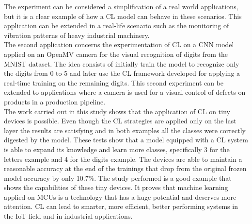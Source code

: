 \documentclass[12pt]{report}
\begin{document}
The experiment can be considered a simplification of a real world applications, but it is a clear example of how a CL model can behave in these scenarios. This application can be extended in a real-life scenario such as the monitoring of vibration patterns of heavy industrial machinery. \\
The second application concerns the experimentation of CL on a CNN model applied on an OpenMV camera for the visual recognition of digits from the MNIST dataset. The idea consists of initially train the model to recognize only the digits from 0 to 5 and later use the CL framework developed for applying a real-time training on the remaining digits. This second experiment can be extended to applications where a camera is used for a visual control of defects on products in a production pipeline.  \\
The work carried out in this study shows that the application of CL on tiny devices is possible. Even though the CL strategies are applied only on the last layer the results are satisfying and in both examples all the classes were correctly digested by the model. These tests show that a model equipped with a CL system is able to expand its knowledge and learn more classes, specifically 3 for the letters example and 4 for the digits example. The devices are able to maintain a reasonable accuracy at the end of the trainings that drop from the original frozen model accuracy by only 10.7\%.
The study performed is a good example that shows the capabilities of these tiny devices. It proves that machine learning applied on MCUs is a technology that has a huge potential and deserves more attention. CL can lead to smarter, more efficient, better performing systems in the IoT field and in industrial applications.
\bigskip
\end{document}
